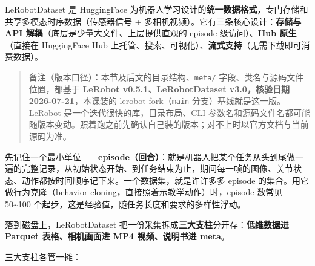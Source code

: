 \documentclass[
  chinese,
]{ctexart}
\begin{document}
LeRobotDataset 是 HuggingFace
为机器人学习设计的\textbf{统一数据格式}，专门存储和共享多模态时序数据（传感器信号
+ 多相机视频）。它有三条核心设计：\textbf{存储与 API
解耦}（底层是少量大文件、上层提供直观的 episode 级访问）、\textbf{Hub
原生}（直接在 HuggingFace Hub
上托管、搜索、可视化）、\textbf{流式支持}（无需下载即可消费数据）。

\begin{quote}
备注（版本口径）：本节及后文的目录结构、\texttt{meta/}
字段、类名与源码文件位置，都基于 \textbf{LeRobot v0.5.1、LeRobotDataset
v3.0，核验日期 2026-07-21}，本课装的 lerobot fork（\texttt{main}
分支）基线就是这一版。LeRobot 是一个迭代很快的库，目录布局、CLI
参数名和源码文件名都可能随版本变动。照着跑之前先确认自己装的版本；对不上时以官方文档与当前源码为准。
\end{quote}

先记住一个最小单位------\textbf{episode（回合）}：就是机器人把某个任务从头到尾做一遍的完整记录，从初始状态开始、到任务结束为止，期间每一帧的图像、关节状态、动作都按时间顺序记下来。一个数据集，就是许许多多
episode 的集合。用它做行为克隆（behavior
cloning，直接照着示教学动作）时，episode 数常见 50\textasciitilde100
个起步，这是经验值，随任务长度和要求的多样性浮动。

落到磁盘上，LeRobotDataset
把一份采集拆成\textbf{三大支柱}分开存：\textbf{低维数据进 Parquet
表格、相机画面进 MP4 视频、说明书进 meta}。


三大支柱各管一摊：
\end{document}
